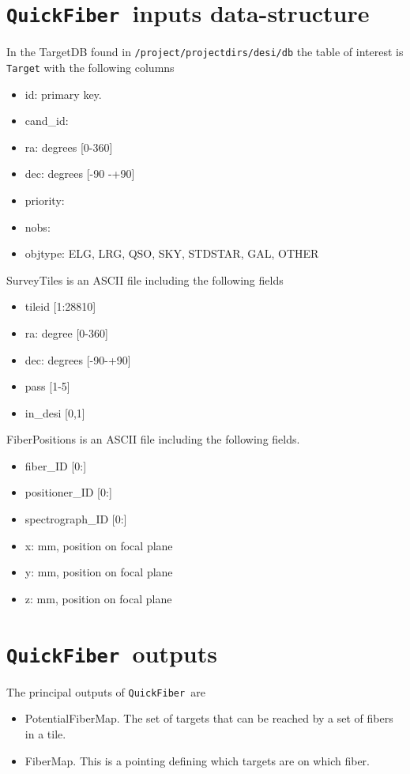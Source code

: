 \documentclass{article}
\newcommand{\code}{{\texttt{QuickFiber}}}
\begin{document}
\section{\code\ inputs data-structure}


In the TargetDB found in \texttt{/project/projectdirs/desi/db} the
table of interest is \texttt{Target} with the following columns

\begin{itemize}
\item id: primary key.
\item cand\_id: 
\item ra: degrees [0-360]
\item dec: degrees [-90 -+90]
\item priority: 
\item nobs: 
\item objtype: ELG, LRG, QSO, SKY, STDSTAR, GAL, OTHER
\end{itemize}

\noindent
SurveyTiles is an ASCII file including the following fields
\begin{itemize}
\item tileid [1:28810]
\item ra: degree [0-360]
\item dec: degrees [-90-+90]
\item pass [1-5]
\item in\_desi [0,1]
\end{itemize}

FiberPositions is an ASCII file including the following fields.
\begin{itemize}
\item fiber\_ID [0:]
\item positioner\_ID  [0:]
\item spectrograph\_ID [0:]
\item x: mm, position on focal plane
\item y: mm, position on focal plane
\item z: mm, position on focal plane
\end{itemize}



\section{\code\ outputs}

The principal outputs of \code\ are
\begin{itemize}
\item PotentialFiberMap. The set of targets that can be reached by a
  set of fibers in a  tile.  
\item FiberMap. This is a pointing defining which targets are on which
  fiber.
\end{itemize}
\end{document}
